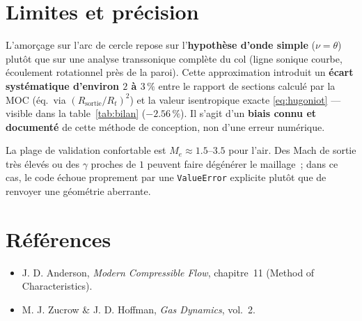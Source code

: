 \documentclass[11pt,a4paper]{article}
\begin{document}
\section{Limites et précision}
\label{sec:limites}

L'amorçage sur l'arc de cercle repose sur l'\textbf{hypothèse d'onde simple}
($\nu = \theta$) plutôt que sur une analyse transsonique complète du col (ligne
sonique courbe, écoulement rotationnel près de la paroi). Cette approximation
introduit un \textbf{écart systématique d'environ $2$ à $3\,\%$} entre le
rapport de sections calculé par la MOC (éq.~via $(R_{\text{sortie}}/R_t)^2$) et
la valeur isentropique exacte \eqref{eq:hugoniot} --- visible dans la
table~\ref{tab:bilan} ($-2.56\,\%$). Il s'agit d'un \textbf{biais connu et
documenté} de cette méthode de conception, non d'une erreur numérique.

La plage de validation confortable est $M_e \approx 1.5$--$3.5$ pour l'air. Des
Mach de sortie très élevés ou des $\gamma$ proches de $1$ peuvent faire
dégénérer le maillage~; dans ce cas, le code échoue proprement par une
\texttt{ValueError} explicite plutôt que de renvoyer une géométrie aberrante.

\section*{Références}
\begin{itemize}[nosep]
  \item J. D. Anderson, \emph{Modern Compressible Flow}, chapitre~11
        (Method of Characteristics).
  \item M. J. Zucrow \& J. D. Hoffman, \emph{Gas Dynamics}, vol.~2.
\end{itemize}
\end{document}
